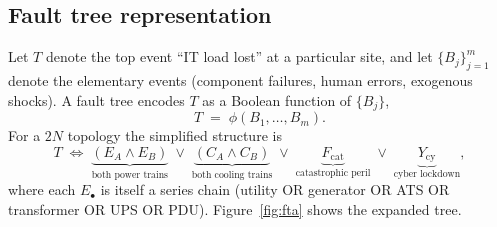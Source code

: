 \documentclass[11pt,a4paper]{article}
\theoremstyle{ia}
\newcommand{\1}{\mathbf{1}}
\begin{document}
\subsection{Fault tree representation}\label{ss:fta}

Let $T$ denote the top event ``IT load lost'' at a particular site,
and let $\{B_j\}_{j=1}^m$ denote the elementary events
(component failures, human errors, exogenous shocks). A fault tree
encodes $T$ as a Boolean function of $\{B_j\}$,
\begin{equation}\label{eq:fta-bool}
   T \;=\; \phi(B_1,\dots,B_m) .
\end{equation}
For a $2N$ topology the simplified structure is
\begin{equation}\label{eq:topdown}
   T \;\Leftrightarrow\;
   \underbrace{(E_A \wedge E_B)}_{\text{both power trains}}
   \;\vee\;
   \underbrace{(C_A \wedge C_B)}_{\text{both cooling trains}}
   \;\vee\;
   \underbrace{F_{\mathrm{cat}}}_{\text{catastrophic peril}}
   \;\vee\;
   \underbrace{Y_{\mathrm{cy}}}_{\text{cyber lockdown}},
\end{equation}
where each $E_\bullet$ is itself a series chain (utility OR generator OR
ATS OR transformer OR UPS OR PDU). Figure~\ref{fig:fta} shows the
expanded tree.
\end{document}
